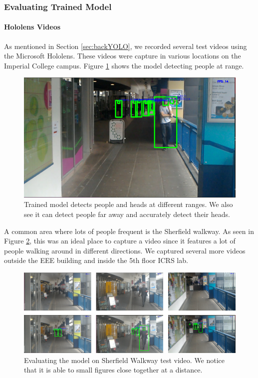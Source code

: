 \subsubsection{Evaluating Trained Model}
\paragraph{Hololens Videos} As mentioned in Section \ref{sec:backYOLO}, we recorded several test videos using the Microsoft Hololens. These videos were capture in various locations on the Imperial College campus. Figure \ref{fig:yoloRange} shows the model detecting people at range.  

\begin{figure}[ht]
	\centering
	\includegraphics[width=0.5\linewidth]{img/chapter5_implementation/yoloWalkway.png}
	\caption{Trained model detects people and heads at different ranges. We also see it can detect people far away and accurately detect their heads.}
	\label{fig:yoloRange}
\end{figure}

A common area where lots of people frequent is the Sherfield walkway. As seen in Figure \ref{fig:yoloSherfield}, this was an ideal place to capture a video since it features a lot of people walking around in different directions. We captured several more videos outside the EEE building and inside the 5th floor ICRS lab.

\begin{figure}[ht]
	\centering
	\includegraphics[width=0.95\linewidth]{img/chapter5_implementation/yoloWalkwayMultiple.png}
	\caption{Evaluating the model on Sherfield Walkway test video. We notice that it is able to small figures close together at a distance.}
	\label{fig:yoloSherfield}
\end{figure}


